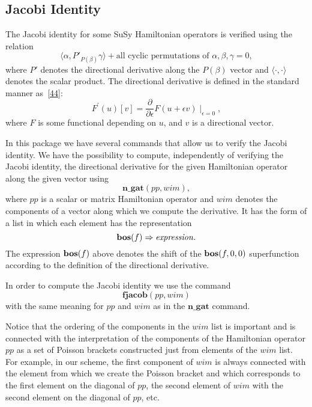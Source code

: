 {\subsection{Jacobi Identity}

The Jacobi identity for some SuSy Hamiltonian operators is verified
using the relation
\begin{equation*}
  \langle \alpha, P'_{P(\beta)} \gamma \rangle +
  \text{all cyclic permutations of } \alpha,\beta,\gamma = 0,
\end{equation*}
where $P'$ denotes the directional derivative along the $P(\beta)$
vector and $\langle\cdot,\cdot\rangle$ denotes the scalar product.
The directional derivative is defined in the standard manner
as~\hyperref[susy2-bib]{[44]}:
\begin{equation*}
  F^{'}(u)[v] = \frac{\partial}{\partial\epsilon}
  F(u+\epsilon v)\mid_{\epsilon =0},
\end{equation*}
where $F$ is some functional depending on $u$, and $v$ is a
directional vector.

In this package we have several commands that allow us to verify the
Jacobi identity.  We have the possibility to compute, independently of
verifying the Jacobi identity, the directional derivative for the
given Hamiltonian operator along the given vector using
\begin{equation*}
  \mathbf{n\_gat}(\mathit{pp}, \mathit{wim}),
\end{equation*}
where $\mathit{pp}$ is a scalar or matrix Hamiltonian operator and
$\mathit{wim}$ denotes the components of a vector along which we
compute the derivative.  It has the form of a list in which each
element has the representation
\begin{equation*}
  \mathbf{bos}(f) \Rightarrow \mathit{expression}.
\end{equation*}
The expression $\mathbf{bos}(f)$ above denotes the shift of the $\mathbf{bos}(f,0,0)$
superfunction according to the definition of the directional
derivative.

In order to compute the Jacobi identity we use the command
\begin{equation*}
  \mathbf{fjacob}(\mathit{pp}, \mathit{wim})
\end{equation*}
with the same meaning for $\mathit{pp}$ and $\mathit{wim}$ as in the
$\mathbf{n\_gat}$ command.

Notice that the ordering of the components in the $\mathit{wim}$ list
is important and is connected with the interpretation of the
components of the Hamiltonian operator $\mathit{pp}$ as a set of
Poisson brackets constructed just from elements of the $\mathit{wim}$
list.  For example, in our scheme, the first component of
$\mathit{wim}$ is always connected with the element from which we
create the Poisson bracket and which corresponds to the first element
on the diagonal of $\mathit{pp}$, the second element of $\mathit{wim}$
with the second element on the diagonal of $\mathit{pp}$, etc.

}
